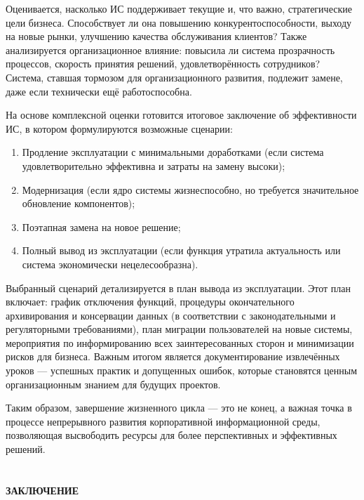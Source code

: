 \documentclass{SibFU-docs}
\begin{document}

Оценивается, насколько ИС поддерживает текущие и, что важно, стратегические цели бизнеса. Способствует ли она повышению конкурентоспособности, выходу на новые рынки, улучшению качества обслуживания клиентов? Также анализируется организационное влияние: повысила ли система прозрачность процессов, скорость принятия решений, удовлетворённость сотрудников? Система, ставшая тормозом для организационного развития, подлежит замене, даже если технически ещё работоспособна.


На основе комплексной оценки готовится итоговое заключение об эффективности ИС, в котором формулируются возможные сценарии:

\begin{enumerate}
    \item Продление эксплуатации с минимальными доработками (если система удовлетворительно эффективна и затраты на замену высоки);
    \item Модернизация (если ядро системы жизнеспособно, но требуется значительное обновление компонентов);
    \item Поэтапная замена на новое решение;
    \item Полный вывод из эксплуатации (если функция утратила актуальность или система экономически нецелесообразна).
\end{enumerate}

Выбранный сценарий детализируется в план вывода из эксплуатации. Этот план включает: график отключения функций, процедуры окончательного архивирования и консервации данных (в соответствии с законодательными и регуляторными требованиями), план миграции пользователей на новые системы, мероприятия по информированию всех заинтересованных сторон и минимизации рисков для бизнеса. Важным итогом является документирование извлечённых уроков — успешных практик и допущенных ошибок, которые становятся ценным организационным знанием для будущих проектов. \cite{OGC_ITIL_2007, gost3460190}

Таким образом, завершение жизненного цикла — это не конец, а важная точка в процессе непрерывного развития корпоративной информационной среды, позволяющая высвободить ресурсы для более перспективных и эффективных решений.

\newpage
\section*{}
\vspace*{-2.5em}
\begin{center}\textbf{ЗАКЛЮЧЕНИЕ}\end{center}
{}
\end{document}
